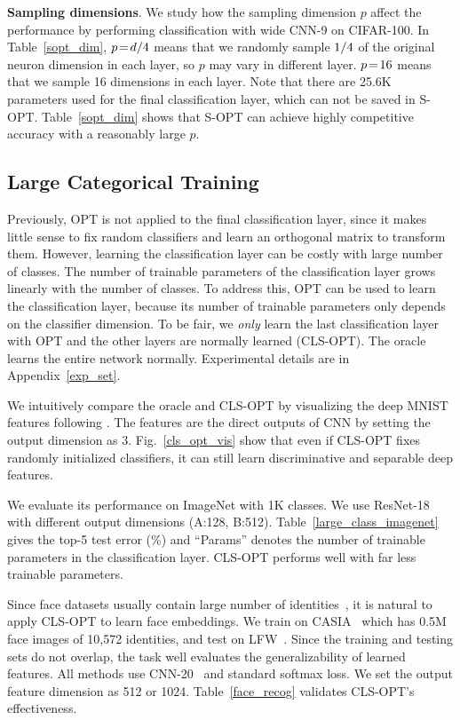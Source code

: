 \textbf{Sampling dimensions}. We study how the sampling dimension $p$ affect the performance by performing classification with wide CNN-9 on CIFAR-100. In Table~\ref{sopt_dim}, $p\thickmuskip=2mu \medmuskip=2mu=d/4$ means that we randomly sample $\thickmuskip=2mu \medmuskip=2mu 1/4$ of the original neuron dimension in each layer, so $p$ may vary in different layer. $\thickmuskip=2mu \medmuskip=2mu p=16$ means that we sample 16 dimensions in each layer. Note that there are 25.6K parameters used for the final classification layer, which can not be saved in S-OPT. Table~\ref{sopt_dim} shows that S-OPT can achieve highly competitive accuracy with a reasonably large $p$.

\subsection{Large Categorical Training}

Previously, OPT is not applied to the final classification layer, since it makes little sense to fix random classifiers and learn an orthogonal matrix to transform them. However, learning the classification layer can be costly with large number of classes. The number of trainable parameters of the classification layer grows linearly with the number of classes. To address this, OPT can be used to learn the classification layer, because its number of trainable parameters only depends on the classifier dimension. To be fair, we \emph{only} learn the last classification layer with OPT and the other layers are normally learned (CLS-OPT). The oracle learns the entire network normally. Experimental details are in Appendix~\ref{exp_set}.

We intuitively compare the oracle and CLS-OPT by visualizing the deep MNIST features following \cite{liu2016lsoftmax}. The features are the direct outputs of CNN by setting the output dimension as 3. Fig.~\ref{cls_opt_vis} show that even if CLS-OPT fixes randomly initialized classifiers, it can still learn discriminative and separable deep features.

We evaluate its performance on ImageNet with 1K classes. We use ResNet-18 with different output dimensions (A:128, B:512). Table~\ref{large_class_imagenet} gives the top-5 test error (\%) and ``Params'' denotes the number of trainable parameters in the classification layer. CLS-OPT performs well with far less trainable parameters.

Since face datasets usually contain large number of identities~\cite{guo2016ms}, it is natural to apply CLS-OPT to learn face embeddings. We train on CASIA~\cite{yi2014learning} which has 0.5M face images of 10,572 identities, and test on LFW~\cite{huang2008labeled}. Since the training and testing sets do not overlap, the task well evaluates the generalizability of learned features. All methods use CNN-20~\cite{Liu2017CVPR} and standard softmax loss. We set the output feature dimension as 512 or 1024. Table~\ref{face_recog} validates CLS-OPT's effectiveness.

